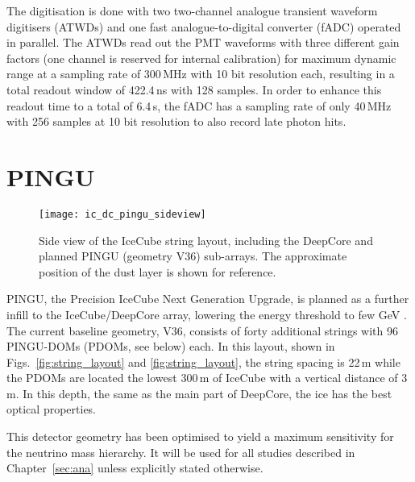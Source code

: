 The digitisation is done with two two-channel analogue transient waveform
digitisers (ATWDs) and one fast analogue-to-digital converter (fADC) operated
in parallel. The ATWDs read out the PMT waveforms with three different gain
factors (one channel is reserved for internal calibration) for maximum dynamic
range at a sampling rate of 300\,MHz with 10 bit resolution each, resulting in
a total readout window of 422.4\,ns with 128 samples. In order to enhance this
readout time to a total of 6.4\,\textmu s, the fADC has a sampling rate of only
40\,MHz with 256 samples at 10 bit resolution to also record late photon hits.



\section{PINGU}
\label{sec:PINGU}

\begin{figure}[thp]
 \centering
 \texttt{[image: ic\_dc\_pingu\_sideview]}
 \caption{Side view of the IceCube string layout, including the DeepCore and
  planned PINGU (geometry V36) sub-arrays. The approximate position of the dust
  layer is shown for reference.}
 \label{fig:string_layout_side}
\end{figure}

PINGU, the Precision IceCube Next Generation Upgrade, is planned as a further 
infill to the IceCube/DeepCore array, lowering the energy threshold to few GeV 
\cite{LoI}. The current baseline geometry, V36, consists of forty additional 
strings with 96 PINGU-DOMs (PDOMs, see below) each. In this layout, shown in
Figs.~\ref{fig:string_layout} and \ref{fig:string_layout}, the string spacing is
22\,m while the PDOMs are located the lowest 300\,m of IceCube with a vertical
distance of 3\,m. In this depth, the same as the main part of DeepCore, the ice
has the best optical properties.

This detector geometry has been optimised to yield a maximum sensitivity for 
the neutrino mass hierarchy. It will be used for all studies described in 
Chapter~\ref{sec:ana} unless explicitly stated otherwise.

